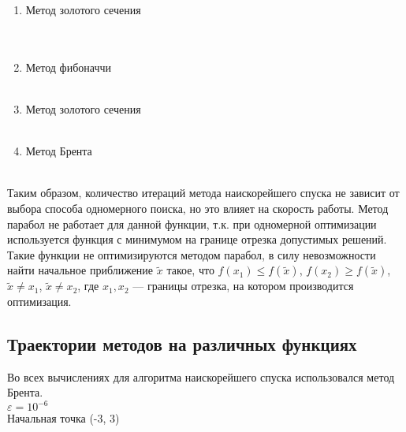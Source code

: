 	
	\begin{enumerate}
		\item Метод золотого сечения \\
		\\
		 \\
		\item Метод фибоначчи \\
		\\
		\item Метод золотого сечения \\
		\\
		\item Метод Брента \\
		\\
	\end{enumerate}
	
	Таким образом, количество итераций метода наискорейшего спуска не зависит от выбора способа одномерного поиска, но это влияет на скорость работы. Метод парабол не работает для данной функции, т.к. при одномерной оптимизации используется функция с минимумом на границе отрезка допустимых решений. Такие функции не оптимизируются методом парабол, в силу невозможности найти начальное приближение \(\tilde{x}\) такое, что \(f(x_1) \leq f(\tilde{x})\), \(f(x_2) \geq f(\tilde{x})\), \(\tilde{x} \neq x_1\), \(\tilde{x} \neq x_2\), где \(x_1, x_2\) --- границы отрезка, на котором производится оптимизация.
	
	\subsection{Траектории методов на различных функциях}
	Во всех вычислениях для алгоритма наискорейшего спуска использовался метод Брента.\\
	$\varepsilon = 10^{-6}$ \\
	Начальная точка (-3, 3) \\
	
